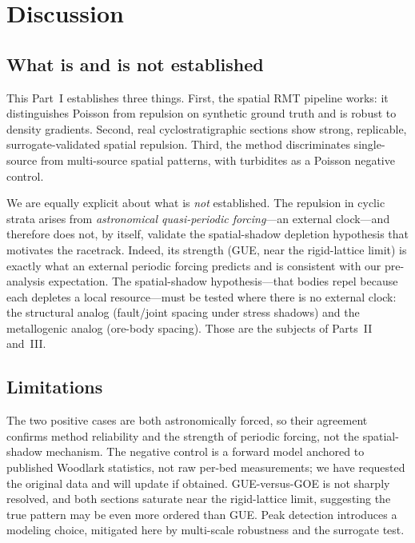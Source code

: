\documentclass[12pt,a4paper]{article}
\begin{document}
\section{Discussion}

\subsection{What is and is not established}
This Part~I establishes three things. First, the spatial RMT pipeline works: it distinguishes Poisson from repulsion on synthetic ground truth and is robust to density gradients. Second, real cyclostratigraphic sections show strong, replicable, surrogate-validated spatial repulsion. Third, the method discriminates single-source from multi-source spatial patterns, with turbidites as a Poisson negative control.

We are equally explicit about what is \emph{not} established. The repulsion in cyclic strata arises from \emph{astronomical quasi-periodic forcing}---an external clock---and therefore does not, by itself, validate the spatial-shadow depletion hypothesis that motivates the racetrack. Indeed, its strength (GUE, near the rigid-lattice limit) is exactly what an external periodic forcing predicts and is consistent with our pre-analysis expectation. The spatial-shadow hypothesis---that bodies repel because each depletes a local resource---must be tested where there is no external clock: the structural analog (fault/joint spacing under stress shadows) and the metallogenic analog (ore-body spacing). Those are the subjects of Parts~II and~III.

\subsection{Limitations}
The two positive cases are both astronomically forced, so their agreement confirms method reliability and the strength of periodic forcing, not the spatial-shadow mechanism. The negative control is a forward model anchored to published Woodlark statistics, not raw per-bed measurements; we have requested the original data and will update if obtained. GUE-versus-GOE is not sharply resolved, and both sections saturate near the rigid-lattice limit, suggesting the true pattern may be even more ordered than GUE. Peak detection introduces a modeling choice, mitigated here by multi-scale robustness and the surrogate test.
\end{document}
